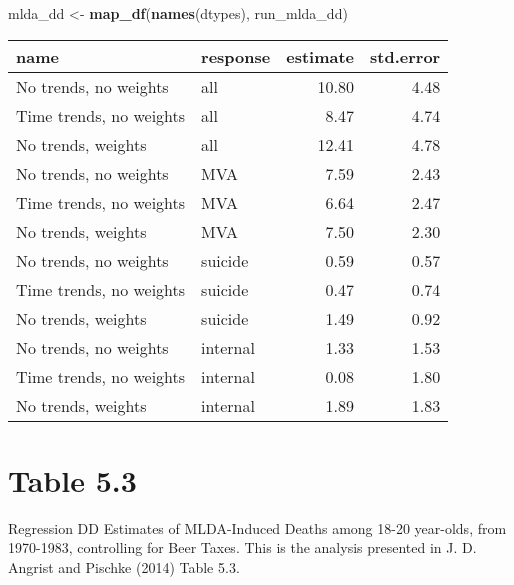 \documentclass[]{book}
\newenvironment{Shaded}{\begin{snugshade}}{\end{snugshade}}
\newcommand{\KeywordTok}[1]{\textcolor[rgb]{0.13,0.29,0.53}{\textbf{#1}}}
\newcommand{\DataTypeTok}[1]{\textcolor[rgb]{0.13,0.29,0.53}{#1}}
\newcommand{\DecValTok}[1]{\textcolor[rgb]{0.00,0.00,0.81}{#1}}
\newcommand{\StringTok}[1]{\textcolor[rgb]{0.31,0.60,0.02}{#1}}
\newcommand{\OperatorTok}[1]{\textcolor[rgb]{0.81,0.36,0.00}{\textbf{#1}}}
\newcommand{\NormalTok}[1]{#1}
\theoremstyle{definition}
\theoremstyle{definition}
\theoremstyle{definition}
\theoremstyle{remark}
\begin{document}
\begin{Shaded}
\begin{Highlighting}[]
\NormalTok{mlda_dd <-}\StringTok{ }\KeywordTok{map_df}\NormalTok{(}\KeywordTok{names}\NormalTok{(dtypes), run_mlda_dd)}
\end{Highlighting}
\end{Shaded}

\begin{Shaded}
\end{Shaded}

\begin{tabular}{l|l|r|r}
\hline
name & response & estimate & std.error\\
\hline
No trends, no weights & all & 10.80 & 4.48\\
\hline
Time trends, no weights & all & 8.47 & 4.74\\
\hline
No trends, weights & all & 12.41 & 4.78\\
\hline
No trends, no weights & MVA & 7.59 & 2.43\\
\hline
Time trends, no weights & MVA & 6.64 & 2.47\\
\hline
No trends, weights & MVA & 7.50 & 2.30\\
\hline
No trends, no weights & suicide & 0.59 & 0.57\\
\hline
Time trends, no weights & suicide & 0.47 & 0.74\\
\hline
No trends, weights & suicide & 1.49 & 0.92\\
\hline
No trends, no weights & internal & 1.33 & 1.53\\
\hline
Time trends, no weights & internal & 0.08 & 1.80\\
\hline
No trends, weights & internal & 1.89 & 1.83\\
\hline
\end{tabular}

\section{Table 5.3}\label{table-5.3}

Regression DD Estimates of MLDA-Induced Deaths among 18-20 year-olds,
from 1970-1983, controlling for Beer Taxes. This is the analysis
presented in J. D. Angrist and Pischke (2014) Table 5.3.
\end{document}
